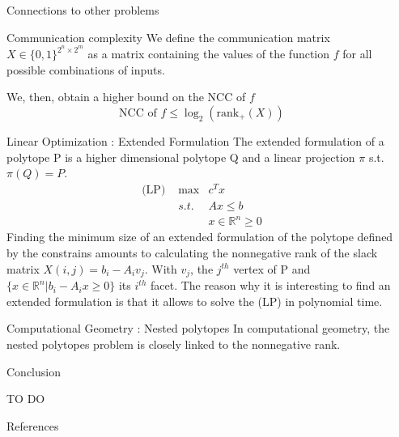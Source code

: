 \documentclass[final]{beamer}
\newlength{\sepwid}
\newlength{\onecolwid}
\begin{document}
\begin{frame}
\begin{columns}[t]
\begin{column}{\onecolwid}
\begin{exampleblock}{Connections to other problems}
\begin{block}{Communication complexity}
    We define the communication matrix $X \in \{0,1\}^{2^n\times 2^m}$ as a matrix containing the values of the function $f$ for all possible combinations of inputs.
    
    We, then, obtain a higher bound on the NCC of $f$
    \[\text{NCC of } f \leq \log_2(\text{rank}_+(X))
    \]
\end{block}

\begin{block}{Linear Optimization : Extended Formulation}
The extended formulation of a polytope P is a higher dimensional polytope Q and a linear projection $\pi$ s.t. $\pi(Q) = P$.
    \begin{align*}
    \text{(LP) } & \max & c^T x\\
     &s.t. & Ax\leq b\\
     & & x \in \mathbb{R}^n \geq 0
    \end{align*}
    Finding the minimum size of an extended formulation of the polytope defined by the constrains amounts to calculating the nonnegative rank of the slack matrix $X(i,j) = b_i-A_iv_j$. With $v_j$, the $j^{th}$ vertex of P and $\{x\in \mathbb{R}^n | b_i-A_ix\geq 0\}$ its $i^{th}$ facet.
    The reason why it is interesting to find an extended formulation is that it allows to solve the (LP) in polynomial time.
\end{block}
\begin{block}{Computational Geometry : Nested polytopes}
 In computational geometry, the nested polytopes problem is closely linked to the nonnegative rank.
\end{block}

\end{exampleblock}


\begin{alertblock}{Conclusion}

TO DO

\end{alertblock}


\begin{alertblock}{References}

\begin{thebibliography}{99}
\end{thebibliography}

\end{alertblock}
\end{column}
\begin{column}{\sepwid}
\end{column} %
\end{columns} %
\end{frame} %
\end{document}
